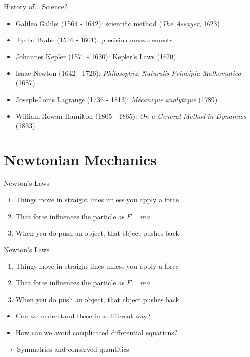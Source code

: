 \documentclass[10pt,xcolor={table,dvipsnames},t]{beamer}
\begin{document}
\begin{frame}{History of... Science?}
    \begin{itemize}
        \item Galileo Galilei (1564 - 1642): scientific method (\textit{The Assayer}, 1623)
        \item Tycho Brahe (1546 - 1601): precision measurements
        \item Johannes Kepler (1571 - 1630): Kepler's Laws (1620)
        \item Isaac Newton (1642 - 1726): \textit{Philosophiæ Naturalis Principia Mathematica} (1687)
        \item Joseph-Louis Lagrange (1736 - 1813): \textit{Mécanique analytique} (1789)
        \item William Rowan Hamilton (1805 - 1865): \textit{On a General Method in Dynamics} (1833)
    \end{itemize}
\end{frame}

\section{Newtonian Mechanics}

\begin{frame}{Newton's Laws}
    \begin{enumerate}
        \item Things move in straight lines unless you apply a force
        \item That force influences the particle as $F = ma$
        \item When you do push an object, that object pushes back
    \end{enumerate}

\end{frame}

\begin{frame}{Newton's Laws}
    \begin{enumerate}
        \item Things move in straight lines unless you apply a force
        \item That force influences the particle as $F = ma$
        \item When you do push an object, that object pushes back
    \end{enumerate}
    \begin{itemize}
        \item Can we understand these in a different way?
        \item How can we avoid complicated differential equations?
    \end{itemize}
    \begin{center}
        $\to$ Symmetries and conserved quantities
    \end{center}
\end{frame}
\end{document}
